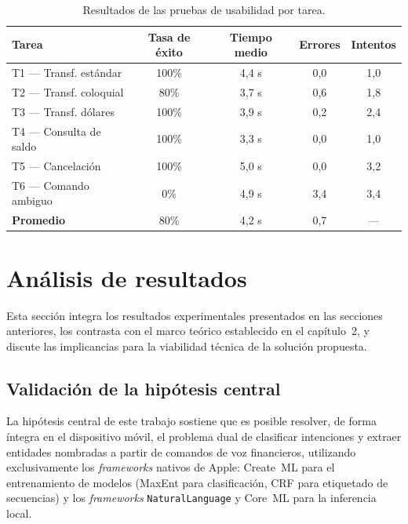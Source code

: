 \begin{table}[H]
\caption{Resultados de las pruebas de usabilidad por tarea.}

\centering
\label{tab:usabilidad}
\begin{tabular}{@{}lcccc@{}}
\toprule
\textbf{Tarea}
  & \textbf{Tasa de éxito}
  & \textbf{Tiempo medio}
  & \textbf{Errores}
  & \textbf{Intentos} \\
\midrule
T1 --- Transf. estándar   & 100\%  & 4,4 s & 0,0 & 1,0 \\
T2 --- Transf. coloquial  & 80\%   & 3,7 s & 0,6 & 1,8 \\
T3 --- Transf. dólares    & 100\%  & 3,9 s & 0,2 & 2,4 \\
T4 --- Consulta de saldo  & 100\%  & 3,3 s & 0,0 & 1,0 \\
T5 --- Cancelación        & 100\%  & 5,0 s & 0,0 & 3,2 \\
T6 --- Comando ambiguo    & 0\%    & 4,9 s & 3,4 & 3,4 \\
\midrule
\textbf{Promedio}         & 80\%   & 4,2 s & 0,7 & --- \\
\bottomrule
\end{tabular}
\end{table}

\section{Análisis de resultados}
\label{sec:analisis}

Esta sección integra los resultados experimentales presentados en las secciones anteriores, los contrasta con el marco teórico establecido en el capítulo~2, y discute las implicancias para la viabilidad técnica de la solución propuesta.

\subsection{Validación de la hipótesis central}
\label{subsec:validacion-hipotesis}

La hipótesis central de este trabajo sostiene que es posible resolver, de forma íntegra en el dispositivo móvil, el problema dual de clasificar intenciones y extraer entidades nombradas a partir de comandos de voz financieros, utilizando exclusivamente los \textit{frameworks} nativos de Apple: Create~ML para el entrenamiento de modelos (MaxEnt para clasificación, CRF para etiquetado de secuencias) y los \textit{frameworks} \texttt{NaturalLanguage} y Core~ML para la inferencia local.

